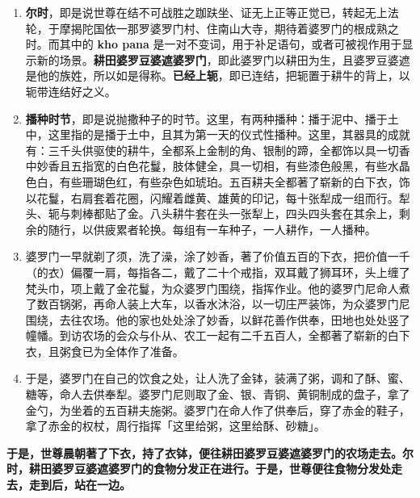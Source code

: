 \begin{enumerate}\item \textbf{尔时}，即是说世尊在结不可战胜之跏趺坐、证无上正等正觉已，转起无上法轮，于摩揭陀国依一那罗婆罗门村、住南山大寺，期待着婆罗门的根成熟之时。而其中的 \textbf{kho pana} 是一对不变词，用于补足语句，或者可被视作用于显示新的场景。\textbf{耕田婆罗豆婆遮婆罗门}，即此婆罗门以耕田为生，且婆罗豆婆遮是他的族姓，所以如是得称。\textbf{已经上轭}，即已连结，把轭置于耕牛的背上，以轭带连结好之义。
\item \textbf{播种时节}，即是说抛撒种子的时节。这里，有两种播种：播于泥中、播于土中，这里指的是播于土中，且其为第一天的仪式性播种。这里，其器具的成就有：三千头供驱使的耕牛，全都系上金制的角、银制的蹄，全都饰以具一切香中妙香且五指宽的白色花鬘，肢体健全，具一切相，有些漆色般黑，有些水晶色白，有些珊瑚色红，有些杂色如琥珀。五百耕夫全都著了崭新的白下衣，饰以花鬘，右肩套着花圈，闪耀着雌黄、雄黄的印记，每十张犁成一组而行。犁头、轭与刺棒都贴了金。八头耕牛套在头一张犁上，四头四头套在其余上，剩余的随行，以供疲累者轮换。每组有一车种子，一人耕作，一人播种。
\item 婆罗门一早就剃了须，洗了澡，涂了妙香，著了价值五百的下衣，把价值一千（的衣）偏覆一肩，每指各二，戴了二十个戒指，双耳戴了狮耳环，头上缠了梵头巾，项上戴了金花鬘，为众婆罗门围绕，指挥作业。他的婆罗门尼命人煮了数百锅粥，再命人装上大车，以香水沐浴，以一切庄严装饰，为众婆罗门尼围绕，去往农场。他的家也处处涂了妙香，以鲜花善作供奉，田地也处处竖了幢幡。到访农场的会众与仆从、农工一起有二千五百人，全都著了崭新的白下衣，且粥食已为全体作了准备。
\item 于是，婆罗门在自己的饮食之处，让人洗了金钵，装满了粥，调和了酥、蜜、糖等，命人去供奉犁。婆罗门尼则取了金、银、青铜、黄铜制成的盘子，拿了金勺，为坐着的五百耕夫施粥。婆罗门在命人作了供奉后，穿了赤金的鞋子，拿了赤金的权杖，周行指挥「这里给粥，这里给酥、砂糖」。\end{enumerate}

\textbf{于是，世尊晨朝著了下衣，持了衣钵，便往耕田婆罗豆婆遮婆罗门的农场走去。尔时，耕田婆罗豆婆遮婆罗门的食物分发正在进行。于是，世尊便往食物分发处走去，走到后，站在一边。}

